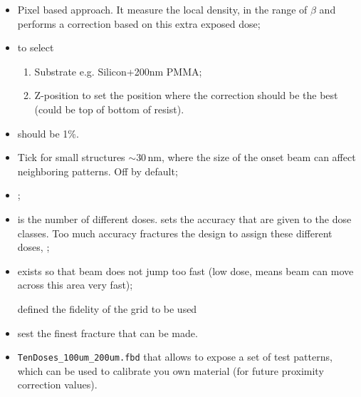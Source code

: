  \begin{itemize}
 \item {}  Pixel based
   approach. It measure the local density, in  the range of $ \beta $ and
   performs a correction based on this extra exposed dose;
 \item {} to select
   \begin{enumerate}
   \item Substrate e.g. Silicon+200nm PMMA;
   \item Z-position to  set the position where  the correction should
     be the best (could be  top of bottom of resist).  
   \end{enumerate}
 \item {} should be 1\%.
 \item Tick  for small structures
   $  \sim  30\,$nm,  where  the  size of  the  onset  beam  can  affect
   neighboring patterns.  Off by default;
 \item {};
 \item  {}  is  the  number  of
   different doses.   sets  the accuracy that are given
   to the  dose classes.  Too  much accuracy fractures the  design to
   assign these different doses, \textbf{};
 \item {} exists so that  beam does not jump too fast
   (low dose, means beam can move across this area very fast);

\begin{framed}\noindent
   defined  the fidelity  of the  grid to  be used
\end{framed}

\item {} sest  the finest fracture that can be
  made.
\item  {}  \ira  \verb|TenDoses_100um_200um.fbd|  that
  allows  to expose  a set  of test  patterns, which  can be  used to
  calibrate  you  own  material   (for  future  proximity  correction
  values).
\end{itemize}

